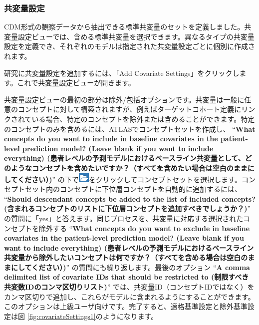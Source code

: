 \documentclass[
  11pt]{book}
\theoremstyle{definition}
\theoremstyle{definition}
\theoremstyle{definition}
\theoremstyle{definition}
\theoremstyle{remark}
\begin{document}
\subsubsection*{共変量設定}\label{ux5171ux5909ux91cfux8a2dux5b9a}

CDM形式の観察データから抽出できる標準共変量のセットを定義しました。共変量設定ビューでは、含める標準共変量を選択できます。異なるタイプの共変量設定を定義でき、それぞれのモデルは指定された共変量設定ごとに個別に作成されます。

研究に共変量設定を追加するには、「Add Covariate Settings」をクリックします。これで共変量設定ビューが開きます。

共変量設定ビューの最初の部分は除外/包括オプションです。共変量は一般に任意のコンセプトに対して構築されますが、例えばターゲットコホート定義にリンクされている場合、特定のコンセプトを除外または含めることができます。特定のコンセプトのみを含めるには、ATLASでコンセプトセットを作成し、 ``\textbf{What concepts do you want to include in baseline covariates in the patient-level prediction model? (Leave blank if you want to include everything) (患者レベルの予測モデルにおけるベースライン共変量として、どのようなコンセプトを含めたいですか？（すべてを含めたい場合は空白のままにしてください）)}'' の下で\includegraphics{images/PopulationLevelEstimation/open.png}をクリックしてコンセプトセットを選択します。コンセプトセット内のコンセプトに下位層コンセプトを自動的に追加するには、 ``\textbf{Should descendant concepts be added to the list of included concepts? (含まれるコンセプトのリストに下位層コンセプトを追加すべきでしょうか？)}'' の質問に「yes」と答えます。同じプロセスを、共変量に対応する選択されたコンセプトを除外する ``\textbf{What concepts do you want to exclude in baseline covariates in the patient-level prediction model? (Leave blank if you want to include everything) (患者レベルの予測モデルにおけるベースライン共変量から除外したいコンセプトは何ですか？（すべてを含める場合は空白のままにしてください）)}'' の質問にも繰り返します。最後のオプション ``\textbf{A comma delimited list of covariate IDs that should be restricted to (制限すべき共変数IDのコンマ区切りリスト)}'' では、共変量ID（コンセプトIDではなく）をカンマ区切りで追加し、これらがモデルに含まれるようにすることができます。このオプションは上級ユーザ向けです。完了すると、適格基準設定と除外基準設定は図 \ref{fig:covariateSettings1}のようになります。
\end{document}
